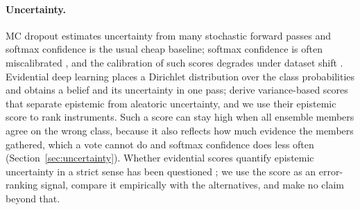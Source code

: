 \paragraph{Uncertainty.}
MC dropout \citep{gal2016dropout} estimates uncertainty from many stochastic forward passes and softmax confidence is the usual cheap baseline; softmax confidence is often miscalibrated \citep{guo2017calibration}, and the calibration of such scores degrades under dataset shift \citep{ovadia2019trust}.
Evidential deep learning \citep{sensoy2018evidential} places a Dirichlet distribution over the class probabilities and obtains a belief and its uncertainty in one pass; \citet{duan2024evidential} derive variance-based scores that separate epistemic from aleatoric uncertainty, and we use their epistemic score to rank instruments.
Such a score can stay high when all ensemble members agree on the wrong class, because it also reflects how much evidence the members gathered, which a vote cannot do and softmax confidence does less often (Section~\ref{sec:uncertainty}).
Whether evidential scores quantify epistemic uncertainty in a strict sense has been questioned \citep{shen2024mirage}; we use the score as an error-ranking signal, compare it empirically with the alternatives, and make no claim beyond that.
